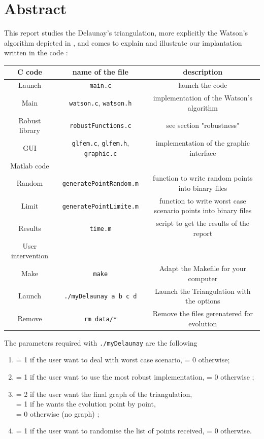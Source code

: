 \section*{Abstract}
This report studies the Delaunay's triangulation, more explicitly the Watson's algorithm depicted in \cite{de2000computational}, and comes to explain and illustrate our implantation written in the code : 
\begin{table}[h!]
\centering
\begin{tabular}{c|cc}
C code & name of the file & description \\
\hline
Launch  & \texttt{main.c} & launch the code \\
Main  & \texttt{watson.c}, \texttt{watson.h} & implementation of the Watson's algorithm \\
Robust library & \texttt{robustFunctions.c} & see section "robustness" \\
GUI & \texttt{glfem.c}, \texttt{glfem.h}, \texttt{graphic.c} & implementation of the graphic interface \\
\hline
\hline
Matlab code & & \\
\hline 
 Random& \texttt{generatePointRandom.m} & function to write random points into binary files\\
 Limit  & \texttt{generatePointLimite.m} & function to write worst case scenario points into binary files \\
 Results & \texttt{time.m}				& script to get the results of the report\\
 \hline
\hline
User intervention & & \\
\hline
Make 	& \texttt{make} & Adapt the Makefile for your computer \\
Launch  & \texttt{./myDelaunay a b c d} & Launch the Triangulation with the options \\
Remove  & \texttt{rm data/*} 			& Remove the files gerenatered for evolution
\end{tabular}
\end{table} 

The parameters required with \texttt{./myDelaunay} are the following
\begin{enumerate}[label=\textbf{\alph*}]
\item = 1 if the user want to deal with worst case scenario, = 0 otherwise;
\item = 1 if the user want to use the most robust implementation, = 0 otherwise ;
\item = 2 if the user want the final graph of the triangulation, \\ = 1 if he wants the evolution point by point, \\= 0 otherwise (no graph)  ;
\item = 1 if the user want to randomise the list of points received, = 0 otherwise.
\end{enumerate}

